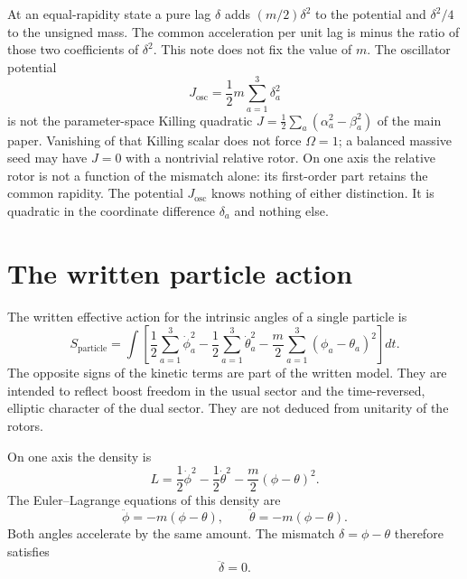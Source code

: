 \documentclass[a4paper]{article}
\begin{document}
At an equal-rapidity state a pure lag \(\delta\) adds \((m/2)\delta^2\) to the potential and \(\delta^2/4\) to the unsigned mass. The common acceleration per unit lag is minus the ratio of those two coefficients of \(\delta^2\). This note does not fix the value of \(m\). The oscillator potential
\[
J_{\mathrm{osc}}
  =\frac12 m\sum_{a=1}^3\delta_a^2
\]
is not the parameter-space Killing quadratic \(J=\frac12\sum_a(\alpha_a^2-\beta_a^2)\) of the main paper. Vanishing of that Killing scalar does not force \(\Omega=1\); a balanced massive seed may have \(J=0\) with a nontrivial relative rotor. On one axis the relative rotor is not a function of the mismatch alone: its first-order part retains the common rapidity. The potential \(J_{\mathrm{osc}}\) knows nothing of either distinction. It is quadratic in the coordinate difference \(\delta_a\) and nothing else.

\section{The written particle action}

The written effective action for the intrinsic angles of a single particle is
\[
S_{\mathrm{particle}}
  =\int\left[
    \frac12\sum_{a=1}^3\dot\phi_a^2
    -\frac12\sum_{a=1}^3\dot\theta_a^2
    -\frac m2\sum_{a=1}^3(\phi_a-\theta_a)^2
  \right]dt.
\]
The opposite signs of the kinetic terms are part of the written model. They are intended to reflect boost freedom in the usual sector and the time-reversed, elliptic character of the dual sector. They are not deduced from unitarity of the rotors.

On one axis the density is
\[
L
  =\frac12\dot\phi^2
  -\frac12\dot\theta^2
  -\frac m2(\phi-\theta)^2.
\]
The Euler--Lagrange equations of this density are
\begin{equation}
\ddot\phi=-m(\phi-\theta),\qquad
\ddot\theta=-m(\phi-\theta).
\label{eq:written-el}
\end{equation}
Both angles accelerate by the same amount. The mismatch \(\delta=\phi-\theta\) therefore satisfies
\begin{equation}
\ddot\delta=0.
\label{eq:free}
\end{equation}
\end{document}
